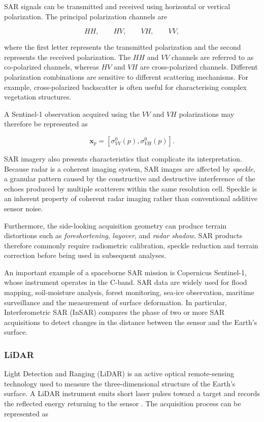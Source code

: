 \documentclass[11pt,a4paper]{article}
\begin{document}
SAR signals can be transmitted and received using horizontal or vertical
polarization. The principal polarization channels are

\[
HH,\qquad HV,\qquad VH,\qquad VV,
\]

where the first letter represents the transmitted polarization and the
second represents the received polarization. The \(HH\) and \(VV\)
channels are referred to as co-polarized channels, whereas \(HV\) and
\(VH\) are cross-polarized channels. Different polarization combinations
are sensitive to different scattering mechanisms. For example,
cross-polarized backscatter is often useful for characterising complex
vegetation structures.

A Sentinel-1 observation acquired using the \(VV\) and \(VH\)
polarizations may therefore be represented as

\[
\mathbf{x}_p =
\left[
\sigma^0_{VV}(p),
\sigma^0_{VH}(p)
\right].
\]

SAR imagery also presents characteristics that complicate its
interpretation. Because radar is a coherent imaging system, SAR images
are affected by \textit{speckle}, a granular pattern caused by the
constructive and destructive interference of the echoes produced by
multiple scatterers within the same resolution cell. Speckle is an
inherent property of coherent radar imaging rather than conventional
additive sensor noise.

Furthermore, the side-looking acquisition geometry can produce terrain
distortions such as \textit{foreshortening}, \textit{layover}, and
\textit{radar shadow}. SAR products therefore commonly require
radiometric calibration, speckle reduction and terrain correction before
being used in subsequent analyses.

An important example of a spaceborne SAR mission is Copernicus
Sentinel-1, whose instrument operates in the C-band. SAR data are widely
used for flood mapping, soil-moisture analysis, forest monitoring,
sea-ice observation, maritime surveillance and the measurement of
surface deformation. In particular, Interferometric SAR (InSAR) compares
the phase of two or more SAR acquisitions to detect changes in the
distance between the sensor and the Earth's surface.

\subsubsection{LiDAR}

Light Detection and Ranging (LiDAR) is an active optical remote-sensing
technology used to measure the three-dimensional structure of the
Earth's surface. A LiDAR instrument emits short laser pulses toward a
target and records the reflected energy returning to the sensor
\cite{baltsavias1999airborne}. The acquisition process can be represented
as
\end{document}
